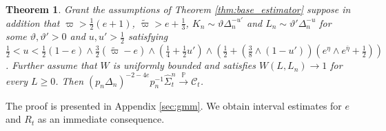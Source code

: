 \documentclass[ecta,nameyear,draft]{econsocart}
\newtheorem{theorem}{Theorem}[section]
\def\wt{\widetilde}
\def\wh{\widehat}
\def\wb{\overline}
\newcommand{\1}{\mathbf 1}
\def\E{\mathbb{E}}
\newcommand{\calC}{\mathcal{C}}
\newcommand{\calF}{\mathcal{F}}
\newcommand{\calZ}{\mathcal{Z}}
\numberwithin{equation}{section}
\newcommand{\ov}{\overline}
\newcommand{\Den}{\Delta_n}
\newcommand{\limp}{\stackrel{\mathbb{P}}{\longrightarrow}}
\begin{document}
\begin{theorem}
\label{thm:asymptotic_variance}
Grant the assumptions of Theorem \ref{thm:base_estimator} 
suppose in addition that $
\varpi > \frac12(e+1)$, 
$\wt \varpi > 
e + \frac13$, $
K_n \sim \vartheta \Delta_n^{-u'}$ and $L_n \sim  \vartheta' \Delta_n^{-u}$ for some $\vartheta,\vartheta'>0$ and $u,u'>\frac12$ satisfying
 $\frac12 < u < \frac12(1-e)\wedge\frac32(\wt \varpi-e) \wedge (\frac14+\frac12u')\wedge (\frac12+(\frac 38\wedge(1-u'))(e^\eta\wedge e^{\ov\eta}+\frac12))%
$. 
Further assume that
 $W$ is uniformly bounded and satisfies $W(L,L_n) \to 1$ for every $L \geq 0$. Then $(p_n\Den)^{-2-4e}p_n^{-1}\wh\Sigma^{n}_t\limp\calC_t$.
\end{theorem}
The proof is presented in Appendix \ref{sec:gmm}. We obtain interval estimates for $e$ and $R_t$ as an immediate consequence.
\end{document}
